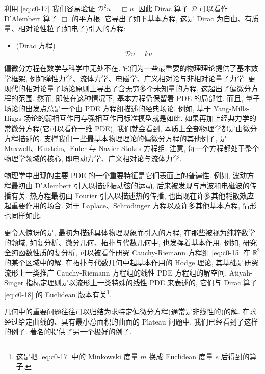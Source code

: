 利用 \eqref{eq:c0-17} 我们容易验证 $\mathcal{D}^{2} u = \Box u$.
因此 Dirac 算子 $\mathcal{D}$ 可以看作 D'Alembert 算子 $\Box$ 的平方根.
它导出了如下基本方程, 这是 Dirac 为自由、有质量、相对论性粒子(如电子)引入的方程:

\begin{itemize}
\item (Dirac 方程)
\begin{equation}\label{eq:c0-19}
\mathcal{D} u = k u
\end{equation}
\end{itemize}

偏微分方程在数学与科学中无处不在.
它们为一些最重要的物理理论提供了基本数学框架, 例如弹性力学、流体力学、电磁学、广义相对论与非相对论量子力学.
更现代的相对论量子场论原则上导出了含无穷多个未知量的方程, 这超出了偏微分方程的范围.
然而, 即使在这种情况下, 基本方程仍保留着 PDE 的局部性.
而且, 量子场论的出发点总是一个由 PDE 方程组描述的经典场论.
例如, 基于 Yang-Mills-Higgs 场论的弱相互作用与强相互作用标准模型就是如此.
如果再加上经典力学的常微分方程(它可以看作一维 PDE), 我们就会看到, 本质上全部物理学都是由微分方程描述的.
支撑我们一些最基本物理理论的偏微分方程的其他例子, 是 Maxwell、Einstein、Euler 与 Navier-Stokes 方程组.
注意, 每一个方程都处于整个物理学领域的核心, 即电动力学、广义相对论与流体力学.

物理学中出现的主要 PDE 的一个重要特征是它们表面上的普遍性.
例如, 波动方程最初由 D'Alembert 引入以描述振动弦的运动, 后来被发现与声波和电磁波的传播有关.
热方程最初由 Fourier 引入以描述热的传播, 也出现在许多其他耗散效应起重要作用的场合.
对于 Laplace、Schrödinger 方程以及许多其他基本方程, 情形也同样如此.

更令人惊讶的是, 最初为描述具体物理现象而引入的方程, 在那些被视为纯粹数学的领域, 如复分析、微分几何、拓扑与代数几何中, 也发挥着基本作用.
例如, 研究全纯函数性质的复分析, 可以被看作研究 Cauchy-Riemann 方程组 \eqref{eq:c0-15} 在 $\mathbb{R}^{2}$ 的某个区域中的解.
在拓扑与代数几何中起基本作用的 Hodge 理论, 其基础是研究流形上一类推广 Cauchy-Riemann 方程组的线性 PDE 方程组的解空间.
Atiyah-Singer 指标定理则是以流形上一类特殊的线性 PDE 来表述的, 它们与 Dirac 算子 \eqref{eq:c0-18} 的 Euclidean 版本有关\footnote{这是把 \eqref{eq:c0-17} 中的 Minkowski 度量 $m$ 换成 Euclidean 度量 $e$ 后得到的算子.}.

几何中的重要问题往往可以归结为求特定偏微分方程(通常是非线性的)的解.
在求经过给定曲线的、具有最小总面积的曲面的 Plateau 问题中, 我们已经看到了这样的例子.
著名的提供了另一个极好的例子.

